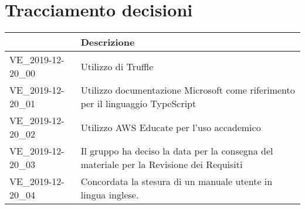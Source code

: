 \section{Tracciamento decisioni}
\renewcommand{\arraystretch}{1.8}

  \begin{longtable}{|p{5cm}|p{9cm}|}
    \hline

    \rowcolor{header}
    \centering{\textbf{Codice}} &  \textbf{Descrizione}\\

    \hline

    VE\_2019-12-20\_00 & Utilizzo di Truffle  \\
    VE\_2019-12-20\_01 & Utilizzo documentazione Microsoft come riferimento per il linguaggio TypeScript\\
    VE\_2019-12-20\_02 & Utilizzo AWS Educate per l'uso accademico\\
    VE\_2019-12-20\_03 & Il gruppo ha deciso la data per la consegna del materiale per la Revisione dei Requisiti\\
    VE\_2019-12-20\_04 & Concordata la stesura di un manuale utente in lingua inglese.\\
    \hline
  \end{longtable}
